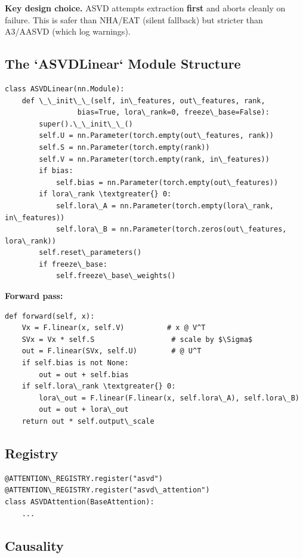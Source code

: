 \textbf{Key design choice.} ASVD attempts extraction \textbf{first} and aborts 
cleanly on failure. This is safer than NHA/EAT (silent fallback) but 
stricter than A3/AASVD (which log warnings).

\subsection{The `ASVDLinear` Module Structure}

\begin{lstlisting}
class ASVDLinear(nn.Module):
    def \_\_init\_\_(self, in\_features, out\_features, rank,
                 bias=True, lora\_rank=0, freeze\_base=False):
        super().\_\_init\_\_()
        self.U = nn.Parameter(torch.empty(out\_features, rank))
        self.S = nn.Parameter(torch.empty(rank))
        self.V = nn.Parameter(torch.empty(rank, in\_features))
        if bias:
            self.bias = nn.Parameter(torch.empty(out\_features))
        if lora\_rank \textgreater{} 0:
            self.lora\_A = nn.Parameter(torch.empty(lora\_rank, in\_features))
            self.lora\_B = nn.Parameter(torch.zeros(out\_features, lora\_rank))
        self.reset\_parameters()
        if freeze\_base:
            self.freeze\_base\_weights()
\end{lstlisting}

\textbf{Forward pass:}

\begin{lstlisting}
def forward(self, x):
    Vx = F.linear(x, self.V)          # x @ V^T
    SVx = Vx * self.S                  # scale by $\Sigma$
    out = F.linear(SVx, self.U)        # @ U^T
    if self.bias is not None:
        out = out + self.bias
    if self.lora\_rank \textgreater{} 0:
        lora\_out = F.linear(F.linear(x, self.lora\_A), self.lora\_B)
        out = out + lora\_out
    return out * self.output\_scale
\end{lstlisting}

\subsection{Registry}

\begin{lstlisting}
@ATTENTION\_REGISTRY.register("asvd")
@ATTENTION\_REGISTRY.register("asvd\_attention")
class ASVDAttention(BaseAttention):
    ...
\end{lstlisting}

\subsection{Causality}


